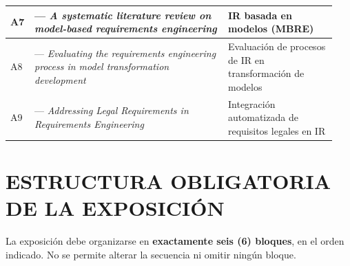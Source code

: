 \documentclass[11pt,a4paper]{article}
\begin{document}
\begin{tabularx}{\linewidth}{|C{0.04\linewidth}|L{0.58\linewidth}|L{0.32\linewidth}|}
		\hline
		\small A7 & \small --- \textit{A systematic literature review on model-based requirements engineering} & \small IR basada en modelos (MBRE)\\
		\hline
		\small A8 & \small --- \textit{Evaluating the requirements engineering process in model transformation development} & \small Evaluación de procesos de IR en transformación de modelos\\
		\hline
		\small A9 & \small --- \textit{Addressing Legal Requirements in Requirements Engineering} & \small Integración automatizada de requisitos legales en IR\\
		\hline
	\end{tabularx}
	
	\section{ESTRUCTURA OBLIGATORIA DE LA EXPOSICIÓN}
	
	La exposición debe organizarse en \textbf{exactamente seis (6) bloques}, en el orden indicado. No se permite alterar la secuencia ni omitir ningún bloque.
	
\end{document}
